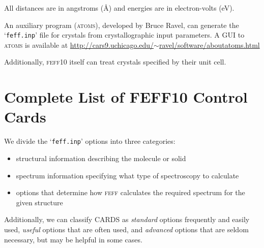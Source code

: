 \documentclass[11pt,oneside]{report} %
\newcommand{\feffcurrent}{\textsc{feff10}}
\renewcommand{\htmladdnormallink}[2]{\href{#2}{#1}}
\newcommand{\program}[1]{\textsc{#1}}
\newcommand{\feff}{\program{feff}}
\newcommand{\file}[1]{`\texttt{#1}'}
\newcommand{\atoms}{\program{atoms}}
\begin{document}

All distances are in angstroms ({\AA}) and energies are in electron-volts (eV). 

An auxiliary program ({\atoms}), developed
by Bruce Ravel, can generate the \file{feff.inp} file for crystals from crystallographic 
input parameters. A GUI to {\atoms} is
available at \htmladdnormallink
{http://cars9.uchicago.edu/$\sim$ravel/software/aboutatoms.html}
{http://cars9.uchicago.edu/~ravel/software/aboutatoms.html}

Additionally, {\feffcurrent} itself can treat crystals specified by their unit cell.



\section{Complete List of FEFF10 Control Cards}
\label{sec:Complete-list-FEFF10}


We divide the \file{feff.inp} options into three categories: 
\begin{itemize}
\item structural information describing the molecule or solid
\item spectrum information specifying what type of spectroscopy to calculate
\item options that determine how {\feff} calculates the required spectrum for the given structure
\end{itemize}

Additionally, we can
classify CARDS as \textsl{standard} options frequently and easily used, \textsl{useful}
options that are often used, and \textsl{advanced} options that are
seldom necessary, but may be helpful in some cases.
\end{document}
